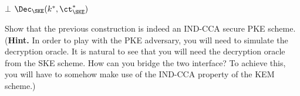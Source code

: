 \begin{problem}
\begin{simplebox}
\begin{minipage}[t]{0.36\textwidth}
\begin{algorithmic}[1]
                        \State \Return $\bot$
                    \Else 
                        \State \Return $\Dec_\SKE(k^\ast, \ct_\SKE^\ast)$
                    \EndIf
                \EndIndent
            \end{algorithmic}
        \end{minipage}
    \end{simplebox}
    Show that the previous construction is indeed an IND-CCA secure PKE scheme.\\
    (\textbf{Hint.} In order to play with the PKE adversary, you will need to simulate the decryption oracle. It is natural to see that you will need the decryption oracle from the SKE scheme. How can you bridge the two interface? To achieve this, you will have to somehow make use of the IND-CCA property of the KEM scheme.)
\end{problem}



